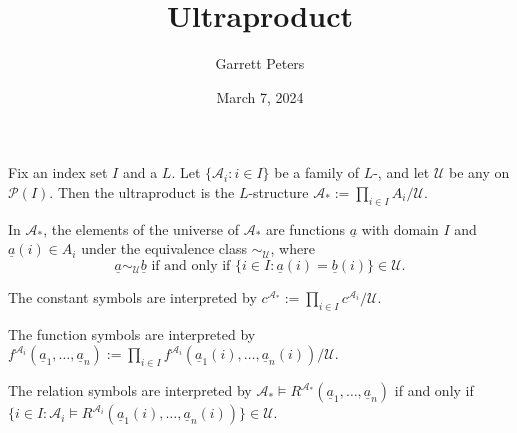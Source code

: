 \documentclass[a4paper]{article}
\title{Ultraproduct}
\date{March 7, 2024}
\author{Garrett Peters}
\begin{document}
\maketitle
\par{Fix an index set \(I\) and a  \(L\). Let \(\{ \mathcal {A}_i: i \in  I \}\) be a family of \(L\)-, and let \(\mathcal {U}\) be any  on \(\mathcal {P}(I)\). Then the ultraproduct is the \(L\)-structure \(\mathcal {A}_* :=  \prod \limits _{i \in  I} A_i / \mathcal {U}\). }\par{In \(\mathcal {A}_*\), the elements of the universe of \(\mathcal {A}_*\) are functions \(\underline {a}\) with domain \(I\) and \(\underline {a}(i) \in  A_i\) under the equivalence class \(\sim _{ \mathcal {U}}\), where \[\underline {a} \sim _{ \mathcal {U}} \underline {b}  \text { if and only if } \{ i \in  I:  \underline {a}(i)= \underline {b}(i) \}   \in   \mathcal {U}.\]}\par{The constant symbols are interpreted by \(c^{ \mathcal {A}_*} :=  \prod \limits _{i \in  I} c^{ \mathcal {A}_i} / \mathcal {U}\). }\par{The function symbols are interpreted by \(f^{ \mathcal {A}_i}( \underline {a}_1, \dots ,  \underline {a}_n) :=  \prod \limits _{i \in  I} f^{ \mathcal {A}_i}( \underline {a}_1(i), \dots , \underline {a}_n(i)) /  \mathcal {U} \). }\par{The relation symbols are interpreted by \(\mathcal {A}_* \models  R^{ \mathcal {A}_*}( \underline {a}_1, \dots ,  \underline {a}_n)\) if and only if \(\{ i \in  I:  \mathcal {A}_i \models  R^{ \mathcal {A}_i}( \underline {a}_1(i), \dots ,  \underline {a}_n(i)) \} \in   \mathcal {U}\).}
\printbibliography
\end{document}
